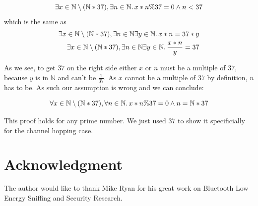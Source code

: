 \documentclass[conference]{IEEEtran}
\begin{document}
\begin{equation*}
  \exists x\in\mathbb{N}\setminus (\mathbb{N} * 37), \exists n\in\mathbb{N}\ldotp x*n \% 37 = 0 \wedge n < 37
\end{equation*}
which is the same as
\begin{equation*}
  \begin{split}
    \exists x\in\mathbb{N}\setminus (\mathbb{N} * 37), \exists n\in\mathbb{N}\exists y\in\mathbb{N}\ldotp x*n = 37 * y \\
    \exists x\in\mathbb{N}\setminus (\mathbb{N} * 37), \exists n\in\mathbb{N}\exists y\in\mathbb{N}\ldotp \frac{x*n}{y} = 37
  \end{split}
\end{equation*}

As we see, to get $37$ on the right side either $x$ or $n$ must be a multiple of $37$, because $y$ is in $\mathbb{N}$ and can't be $\frac{1}{37}$. As $x$ cannot be a multiple of $37$ by definition, $n$ has to be. As such our assumption is wrong and we can conclude:

\begin{equation*}
  \forall x\in\mathbb{N}\setminus (\mathbb{N} * 37), \forall n\in\mathbb{N}\ldotp x*n \% 37 = 0 \wedge n = \mathbb{N} * 37
\end{equation*}

This proof holds for any prime number. We just used 37 to show it specificially for the channel hopping case.

\section*{Acknowledgment}

The author would like to thank Mike Ryan for his great work on Bluetooth Low Energy Sniffing and Security Research.

\ifCLASSOPTIONcaptionsoff
  \newpage
\fi




\end{document}
